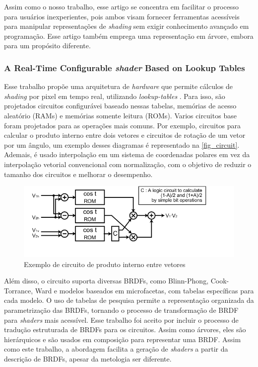 \documentclass[english, 
               brazil, 
               bsc] %
               {dcomp-abntex2}
\begin{document}
Assim como o nosso trabalho, esse artigo se concentra em facilitar o processo para usuários inexperientes, pois ambos visam fornecer ferramentas acessíveis para manipular representações de \textit{shading} sem exigir conhecimento avançado em programação. Esse artigo também emprega uma representação em árvore, embora para um propósito diferente.

\subsubsection{A Real-Time Configurable \textit{shader} Based on Lookup Tables}

Esse trabalho propõe uma arquitetura de \textit{hardware} que permite cálculos de \textit{shading} por pixel em tempo real, utilizando \textit{lookup-tables} \cite{configurable}. Para isso, são projetados circuitos configurávei baseado nessas tabelas, memórias de acesso aleatório (RAMs) e memórias somente leitura (ROMs). Varios circuitos base foram projetados para as operações mais comuns. Por exemplo, circuitos para calcular o produto interno entre dois vetores e circuitos de rotação de um vetor por um ângulo, um exemplo desses diagramas é representado na \autoref{fig_circuit}. Ademais, é usado interpolação em um sistema de coordenadas polares em vez da interpolação vetorial convencional com normalização, com o objetivo de reduzir o tamanho dos circuitos e melhorar o desempenho.


\begin{figure}[H]
	\caption{\label{fig_circuit} Exemplo de circuito de produto interno entre vetores}
	\begin{center}
	    \includegraphics[scale=0.7]{./Imagens/rom-cos-lookup-table.png}
	\end{center}
\end{figure}


Além disso, o circuito suporta diversas BRDFs, como Blinn-Phong, Cook-Torrance, Ward e modelos baseados em microfacetas, com tabelas específicas para cada modelo. O uso de tabelas de pesquisa permite a representação organizada da parametrização das BRDFs, tornando o processo de transformação de BRDF para \textit{shaders} mais acessível. Esse trabalho foi aceito por incluir o processo de tradução estruturada de BRDFs para os circuitos. Assim como árvores, eles são hierárquicos e são usados em composição para representar uma BRDF. Assim como este trabalho, a abordagem facilita a geração de \textit{shaders} a partir da descrição de BRDFs, apesar da metologia ser diferente.
\end{document}

